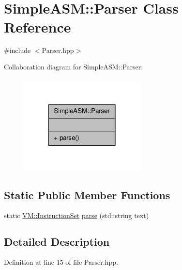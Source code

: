 \hypertarget{class_simple_a_s_m_1_1_parser}{\section{Simple\-A\-S\-M\-:\-:Parser Class Reference}
\label{class_simple_a_s_m_1_1_parser}
}


{\ttfamily \#include $<$Parser.\-hpp$>$}



Collaboration diagram for Simple\-A\-S\-M\-:\-:Parser\-:
\nopagebreak
\begin{figure}[H]
\begin{center}
\leavevmode
\includegraphics[width=182pt]{class_simple_a_s_m_1_1_parser__coll__graph}
\end{center}
\end{figure}
\subsection*{Static Public Member Functions}
\begin{DoxyCompactItemize}
\item 
static \hyperlink{class_v_m_1_1_instruction_set}{V\-M\-::\-Instruction\-Set} \hyperlink{class_simple_a_s_m_1_1_parser_abb5d4c3b5a22575a8fa50999b644728f}{parse} (std\-::string text)
\end{DoxyCompactItemize}


\subsection{Detailed Description}


Definition at line 15 of file Parser.\-hpp.



